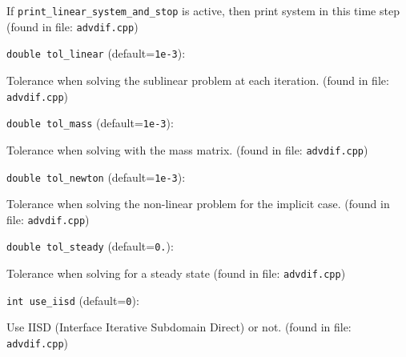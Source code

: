 If \verb+print_linear_system_and_stop+ is active,
then print system in this time step
 (found in file: \verb+advdif.cpp+)
\item\verb+double tol_linear+ {\rm(default=\verb|1e-3|)}:

Tolerance when solving the sublinear problem
at each iteration.
 (found in file: \verb+advdif.cpp+)
\item\verb+double tol_mass+ {\rm(default=\verb|1e-3|)}:

Tolerance when solving with the mass matrix. 
 (found in file: \verb+advdif.cpp+)
\item\verb+double tol_newton+ {\rm(default=\verb|1e-3|)}:

Tolerance when solving the non-linear problem
for the implicit case.
 (found in file: \verb+advdif.cpp+)
\item\verb+double tol_steady+ {\rm(default=\verb|0.|)}:

Tolerance when solving for a steady state
 (found in file: \verb+advdif.cpp+)
\item\verb+int use_iisd+ {\rm(default=\verb|0|)}:

Use IISD (Interface Iterative Subdomain Direct) or not.
 (found in file: \verb+advdif.cpp+)
